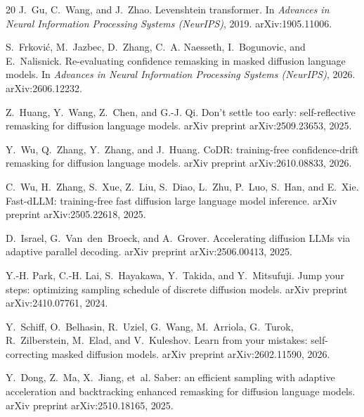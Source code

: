 \documentclass[11pt,a4paper]{article}
\begin{document}
\begin{thebibliography}{20}
J.~Gu, C.~Wang, and J.~Zhao.
\newblock Levenshtein transformer.
\newblock In \emph{Advances in Neural Information Processing Systems (NeurIPS)}, 2019.
\newblock arXiv:1905.11006.

S.~Frkovi\'c, M.~Jazbec, D.~Zhang, C.~A. Naesseth, I.~Bogunovic, and
E.~Nalisnick.
\newblock Re-evaluating confidence remasking in masked diffusion language models.
\newblock In \emph{Advances in Neural Information Processing Systems (NeurIPS)}, 2026.
\newblock arXiv:2606.12232.

Z.~Huang, Y.~Wang, Z.~Chen, and G.-J. Qi.
\newblock Don't settle too early: self-reflective remasking for diffusion language
models.
\newblock arXiv preprint arXiv:2509.23653, 2025.

Y.~Wu, Q.~Zhang, Y.~Zhang, and J.~Huang.
\newblock CoDR: training-free confidence-drift remasking for diffusion language
models.
\newblock arXiv preprint arXiv:2610.08833, 2026.

C.~Wu, H.~Zhang, S.~Xue, Z.~Liu, S.~Diao, L.~Zhu, P.~Luo, S.~Han, and E.~Xie.
\newblock Fast-dLLM: training-free fast diffusion large language model inference.
\newblock arXiv preprint arXiv:2505.22618, 2025.

D.~Israel, G.~Van~den~Broeck, and A.~Grover.
\newblock Accelerating diffusion LLMs via adaptive parallel decoding.
\newblock arXiv preprint arXiv:2506.00413, 2025.

Y.-H. Park, C.-H. Lai, S.~Hayakawa, Y.~Takida, and Y.~Mitsufuji.
\newblock Jump your steps: optimizing sampling schedule of discrete diffusion models.
\newblock arXiv preprint arXiv:2410.07761, 2024.

Y.~Schiff, O.~Belhasin, R.~Uziel, G.~Wang, M.~Arriola, G.~Turok, R.~Zilberstein,
M.~Elad, and V.~Kuleshov.
\newblock Learn from your mistakes: self-correcting masked diffusion models.
\newblock arXiv preprint arXiv:2602.11590, 2026.

Y.~Dong, Z.~Ma, X.~Jiang, et~al.
\newblock Saber: an efficient sampling with adaptive acceleration and backtracking
enhanced remasking for diffusion language models.
\newblock arXiv preprint arXiv:2510.18165, 2025.

\end{thebibliography}
\end{document}
